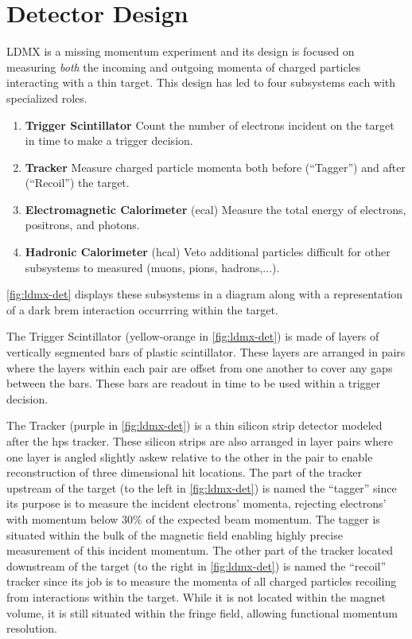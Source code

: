 \section{Detector Design}
LDMX is a missing momentum experiment and its design is focused on measuring \emph{both} the
incoming and outgoing momenta of charged particles interacting with a thin target. This design has
led to four subsystems each with specialized roles.
\begin{enumerate}
  \item \textbf{Trigger Scintillator} Count the number of electrons incident on the target in time to make a trigger decision.
  \item \textbf{Tracker} Measure charged particle momenta both before (``Tagger'') and after (``Recoil'') the target.
  \item \textbf{Electromagnetic Calorimeter} (\ac{ecal}) Measure the total energy of electrons, positrons, and photons.
  \item \textbf{Hadronic Calorimeter} (\ac{hcal}) Veto additional particles difficult for other subsystems to measured (muons, pions, hadrons,...).
\end{enumerate}
\cref{fig:ldmx-det} displays these subsystems in a diagram along with a representation of
a dark brem interaction occurrring within the target.

The Trigger Scintillator (yellow-orange in \cref{fig:ldmx-det}) is made of layers of vertically
segmented bars of plastic scintillator. These layers are arranged in pairs where the layers within
each pair are offset from one another to cover any gaps between the bars. These bars are readout in
time to be used within a trigger decision.

The Tracker (purple in \cref{fig:ldmx-det}) is a thin silicon strip detector modeled after the
\ac{hps} tracker. These silicon strips are also arranged in layer pairs where one layer is angled
slightly askew relative to the other in the pair to enable reconstruction of three dimensional hit
locations. The part of the tracker upstream of the target (to the left in \cref{fig:ldmx-det}) is
named the ``tagger'' since its purpose is to measure the incident electrons' momenta, rejecting
electrons' with momentum below $30\%$ of the expected beam momentum. The tagger is situated within
the bulk of the magnetic field enabling highly precise measurement of this incident momentum. The
other part of the tracker located downstream of the target (to the right in \cref{fig:ldmx-det}) is
named the ``recoil'' tracker since its job is to measure the momenta of all charged particles
recoiling from interactions within the target. While it is not located within the magnet volume, it
is still situated within the fringe field, allowing functional momentum resolution.

